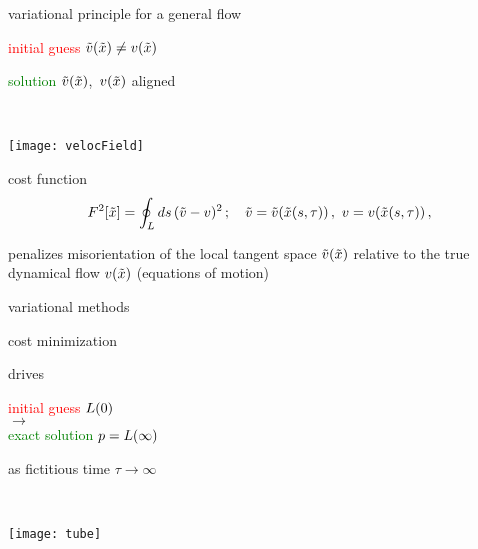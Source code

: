 \begin{frame}{variational principle for a general flow}
\begin{center}
\begin{minipage}[c]{0.55\textwidth}

	\vskip 10pt

\textcolor{red}{initial guess}
$\tilde{v}(\tilde{x})
	\neq
v(\tilde{x})$

	\vskip 1cm

\textcolor{green}{solution} %
$\tilde{v}(\tilde{x})$,~$v(\tilde{x})$
aligned
\end{minipage}%
~~~~~~~\begin{minipage}[c]{0.40\textwidth}
	\begin{center}
	\vskip 10pt
	\texttt{[image: velocField]}
	\end{center}
\end{minipage}
\end{center}

\begin{block}{cost function}%
\[
F^2[\tilde{x}] =
            \oint_L ds\,(\tilde{v}-v)^2
    \,;\quad
    \tilde{v} = \tilde{v}(\tilde{x}(s,\tau))\,,\,\,
    v = v(\tilde{x}(s,\tau))
\,,
\]
\end{block}

\bigskip

penalizes misorientation of the local tangent space
$\tilde{v}(\tilde{x})$
relative to the true dynamical flow $v(\tilde{x})$
 (equations of motion)
\end{frame}

\begin{frame}{variational methods}
\bigskip

cost minimization

\bigskip

\begin{center}
\begin{minipage}[c]{0.55\textwidth}
\begin{center}
\bigskip

drives

\bigskip

	\vskip 1.0cm

\textcolor{red}{initial guess $L(0)$}
\\$\to$\\
\textcolor{green}{exact solution $p = L(\infty)$}

	\vskip 1.0cm

as fictitious time $\tau \to \infty$
\end{center}
\end{minipage}%
~~~~~~~\begin{minipage}[c]{0.40\textwidth}
	\begin{center}
	\texttt{[image: tube]}
	\end{center}
\end{minipage}
\end{center}
\end{frame}

